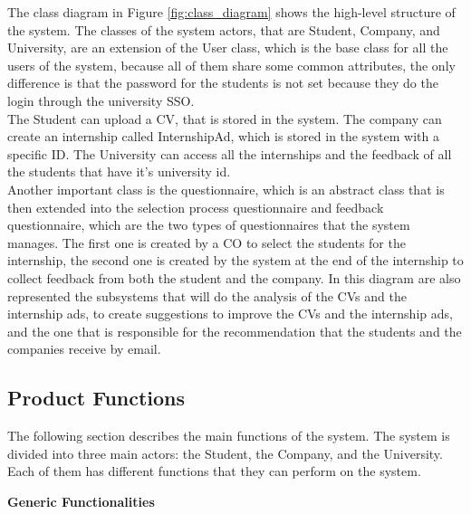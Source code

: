 The class diagram in Figure \ref{fig:class_diagram} shows the high-level structure of the system.
The classes of the system actors, that are Student, Company, and University, are an extension of the User class, which 
is the base class for all the users of the system, because all of them share some common attributes, the only difference is
that the password for the students is not set because they do the login through the university SSO.\\
The Student can upload a CV, that is stored in the system. The company can create an internship called InternshipAd, which is stored in the system with a specific ID.
The University can access all the internships and the feedback of all the students that have it's university id.\\
Another important class is the questionnaire, which is an abstract class that is then extended into the selection process questionnaire and feedback questionnaire, which 
are the two types of questionnaires that the system manages. The first one is created by a CO to select the students for the internship, the second one is created 
by the system at the end of the internship to collect feedback from both the student and the company.
In this diagram are also represented the subsystems that will do the analysis of the CVs and the internship ads, to create 
suggestions to improve the CVs and the internship ads, and the one that is responsible for the recommendation that the students and
the companies receive by email.


\subsection{Product Functions}
\label{sec:product_functions}%

The following section describes the main functions of the system. 
The system is divided into three main actors: the Student, the Company, and the University. 
Each of them has different functions that they can perform on the system.\\

\par\textbf{Generic Functionalities}

